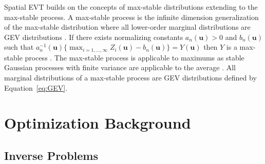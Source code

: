 Spatial EVT builds on the concepts of max-stable distributions extending to the max-stable process. A max-stable process is the infinite dimension generalization of the max-stable distribution where all lower-order marginal distributions are GEV distributions \citep{schlather2003dependence}. If there exists normalizing constants $a_n(\mathbf{u}) > 0$ and $b_n(\mathbf{u})$ such that $a_n^{-1}(\mathbf{u})\{\max_{i=1,...,\infty} Z_i(\mathbf{u}) - b_n(\mathbf{u})\} = Y(\mathbf{u})$ then $Y$ is a max-stable process \citep{dehaan2007extreme}. The max-stable process is applicable to maximums as stable Gaussian processes with finite variance are applicable to the average \citep{chiles2012geostatistics}. All marginal distributions of a max-stable process are GEV distributions defined by Equation~\ref{eq:GEV}.



\FloatBarrier
\section{Optimization Background}
\label{sec:01optreview}

\FloatBarrier
\subsection{Inverse Problems}
\label{subsec:01inverse}

